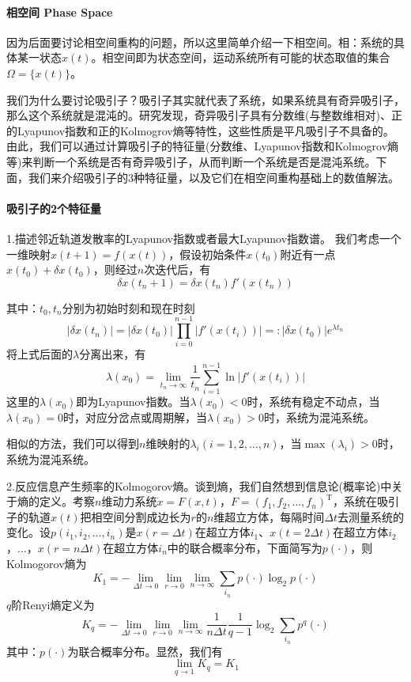         \paragraph{相空间 Phase Space}因为后面要讨论相空间重构的问题，所以这里简单介绍一下相空间。相：系统的具体某一状态$x(t)$。相空间即为状态空间，运动系统所有可能的状态取值的集合$\Omega=\{x(t)\}$。
        \par
        我们为什么要讨论吸引子？吸引子其实就代表了系统，如果系统具有奇异吸引子，那么这个系统就是混沌的。研究发现，奇异吸引子具有分数维(与整数维相对)、正的Lyapunov指数和正的Kolmogrov熵等特性，这些性质是平凡吸引子不具备的。由此，我们可以通过计算吸引子的特征量(分数维、Lyapunov指数和Kolmogrov熵等)来判断一个系统是否有奇异吸引子，从而判断一个系统是否是混沌系统。下面，我们来介绍吸引子的3种特征量，以及它们在相空间重构基础上的数值解法。

        \paragraph{吸引子的2个特征量}1.描述邻近轨道发散率的Lyapunov指数或者最大Lyapunov指数谱。
        我们考虑一个一维映射$x(t+1)=f(x(t))$，假设初始条件$x(t_0)$附近有一点$x(t_0)+\delta x(t_0)$，则经过$n$次迭代后，有
        \[
            \delta x(t_n+1) = \delta x(t_n) f'(x(t_n))
        \]
        \par
        其中：$t_0,t_n$分别为初始时刻和现在时刻
        \[
            |\delta x(t_n)| = |\delta x(t_0)|\prod_{i=0}^{n-1}|f'(x(t_i))| =: |\delta x(t_0)|e^{\lambda t_n}
        \]
        将上式后面的$\lambda$分离出来，有
        \[
            \lambda (x_0) = \lim_{t_n\rightarrow\infty} \frac{1}{t_n} \sum_{i=1}^{n-1}\ln |f'(x(t_i))|
        \]
        这里的$\lambda (x_0)$即为Lyapunov指数。当$\lambda (x_0)<0$时，系统有稳定不动点，当$\lambda (x_0)=0$时，对应分岔点或周期解，当$\lambda (x_0)>0$时，系统为混沌系统。
        \par
        相似的方法，我们可以得到$n$维映射的$\lambda _i (i=1,2,\dots ,n)$，当$\max (\lambda _i)>0$时，系统为混沌系统。
        \par
        2.反应信息产生频率的Kolmogorov熵。谈到熵，我们自然想到信息论(概率论)中关于熵的定义。考察$n$维动力系统$\dot{x}=F(x,t)$，$F=(f_1,f_2,\dots ,f_n)^\mathrm{T}$，系统在吸引子的轨道$x(t)$把相空间分割成边长为$r$的$n$维超立方体，每隔时间$\Delta t$去测量系统的变化。设$p(i_1,i_2,\dots ,i_n)$是$x(r=\Delta t)$在超立方体$i_1$、$x(t=2\Delta t)$在超立方体$i_2$，$\dots$，$x(r=n \Delta t)$在超立方体$i_n$中的联合概率分布，下面简写为$p(\cdot)$，则Kolmogorov熵为
        \[
            K_1 = -\lim _{\Delta t \rightarrow 0}\lim _{r \rightarrow 0}\lim _{n\rightarrow \infty} \sum _{i_n}p(\cdot)\log_2p(\cdot)
        \]
        $q$阶Renyi熵定义为
        \[
            K_q = -\lim _{\Delta t \rightarrow 0}\lim _{r \rightarrow 0}\lim _{n\rightarrow \infty} \frac{1}{n\Delta t} \frac{1}{q-1}\log_2\sum _{i_n}p^q(\cdot)
        \]
        其中：$p(\cdot)$为联合概率分布。显然，我们有
        \[
            \lim _{q\rightarrow 1} K_q = K_1
        \]
